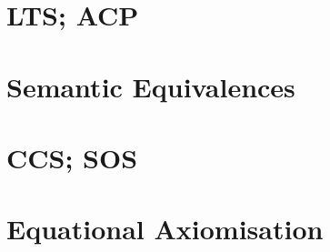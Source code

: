 \documentclass{article}
\begin{document}
\begin{multicols*}{3}

\section{LTS; ACP}


\section{Semantic Equivalences}


\section{CCS; SOS}


\section{Equational Axiomisation}


\end{multicols*}
\end{document}
